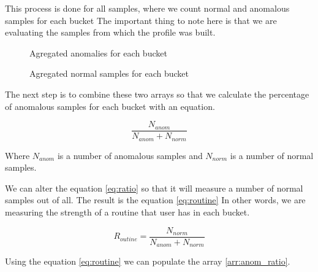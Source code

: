 This process is done for all samples, where we count normal and anomalous samples for each bucket
The important thing to note here is that we are evaluating the samples from which the profile was built.

\begin{figure}[H]
    \centering
    \caption{Agregated anomalies for each bucket}
    \label{arr:agg_anom}
\end{figure}

\begin{figure}[H]
    \centering
    \caption{Agregated normal samples for each bucket}
    \label{arr:agg_norm}
\end{figure}

The next step is to combine these two arrays so that we calculate the percentage of anomalous samples 
for each bucket with an equation. 

\begin{equation}
    \frac{N_{anom}}{N_{anom}+N_{norm}}
    \label{eq:ratio}
\end{equation}

Where $N_{anom}$ is a number of anomalous samples and $N_{norm}$ is a number of normal samples.


We can alter the equation \ref{eq:ratio} so that it will measure
a number of normal samples out of all. 
The result is the equation \ref{eq:routine}
In other words, we are measuring the strength of a routine that 
user has in each bucket.

\begin{equation}
    R_{outine}= \frac{N_{norm}}{N_{anom}+N_{norm}}
    \label{eq:routine}
\end{equation}

Using the equation \ref{eq:routine} we can populate the array \ref{arr:anom_ratio}.

